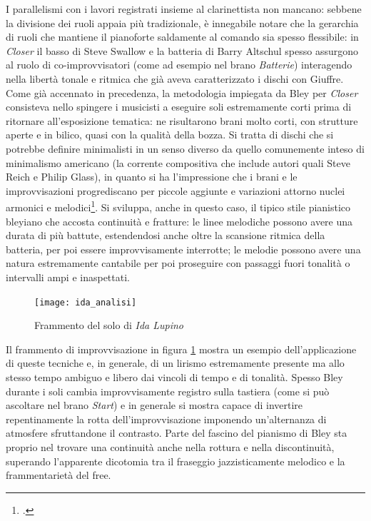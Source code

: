 I parallelismi con i lavori registrati insieme al clarinettista non mancano: sebbene la divisione dei ruoli appaia più tradizionale, è innegabile notare che la gerarchia di ruoli che mantiene il pianoforte saldamente al comando sia spesso flessibile: in \textit{Closer} il basso di Steve Swallow e la batteria di Barry Altschul spesso assurgono al ruolo di co-improvvisatori (come ad esempio nel brano \textit{Batterie}) interagendo nella libertà tonale e ritmica che già aveva caratterizzato i dischi con Giuffre.\\
Come già accennato in precedenza, la metodologia impiegata da Bley per \textit{Closer} consisteva nello spingere i musicisti a eseguire soli estremamente corti prima di ritornare all'esposizione tematica: ne risultarono brani molto corti, con strutture aperte e in bilico, quasi con la qualità della bozza. Si tratta di dischi che si potrebbe definire minimalisti in un senso diverso da quello comunemente inteso di minimalismo americano (la corrente compositiva che include autori quali Steve Reich e Philip Glass), in quanto si ha l'impressione che i brani e le improvvisazioni progrediscano per piccole aggiunte e variazioni attorno nuclei armonici e melodici\footcite[33]{cappelletti}. Si sviluppa, anche in questo caso, il tipico stile pianistico bleyiano che accosta continuità e fratture: le linee melodiche possono avere una durata di più battute, estendendosi anche oltre la scansione ritmica della batteria, per poi essere improvvisamente interrotte; le melodie possono avere una natura estremamente cantabile per poi proseguire con passaggi fuori tonalità o intervalli ampi e inaspettati.
 \begin{figure}[h]
	\centering
	\texttt{[image: ida\_analisi]}
	\caption{Frammento del solo di \textit{Ida Lupino}}
	\label{aida}
\end{figure}
Il frammento di improvvisazione in figura \ref{aida} mostra un esempio dell'applicazione di queste tecniche e, in generale, di un lirismo estremamente presente ma allo stesso tempo ambiguo e libero dai vincoli di tempo e di tonalità. Spesso Bley durante i soli cambia improvvisamente registro sulla tastiera (come si può ascoltare nel brano \textit{Start}) e in generale si mostra capace di invertire repentinamente la rotta dell'improvvisazione imponendo un'alternanza di atmosfere sfruttandone il contrasto. Parte del fascino del pianismo di Bley sta proprio nel trovare una continuità anche nella rottura e nella discontinuità, superando l'apparente dicotomia tra il fraseggio jazzisticamente melodico e la frammentarietà del free.\par
